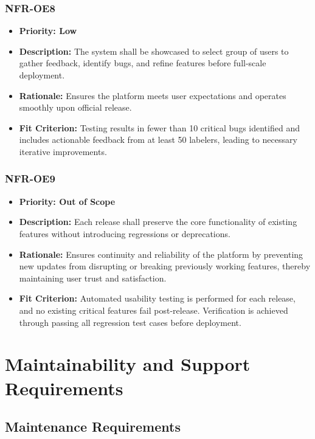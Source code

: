 \documentclass[12pt]{article}
\begin{document}
\subsubsection*{NFR-OE8}
\label{sec:OE8}
\begin{itemize}
  \item \textbf{Priority: Low}
  \item \textbf{Description:} The system shall be showcased to select group of users to gather feedback, identify bugs, and refine features before full-scale deployment.
  \item \textbf{Rationale:} Ensures the platform meets user expectations and operates smoothly upon official release.
  \item \textbf{Fit Criterion:} Testing results in fewer than 10 critical bugs identified and includes actionable feedback from at least 50 labelers, leading to necessary iterative improvements.
\end{itemize}
\subsubsection*{NFR-OE9}
\label{sec:OE9}
\begin{itemize}
  \item \textbf{Priority: Out of Scope}
  \item \textbf{Description:} Each release shall preserve the core functionality of existing features without introducing regressions or deprecations.
  \item \textbf{Rationale:} Ensures continuity and reliability of the platform by preventing new updates from disrupting or breaking previously working features, thereby maintaining user trust and satisfaction.
  \item \textbf{Fit Criterion:} Automated usability testing is performed for each release, and no existing critical features fail post-release. Verification is achieved through passing all regression test cases before deployment.
\end{itemize}


\section{Maintainability and Support Requirements}
\subsection{Maintenance Requirements}
\end{document}
